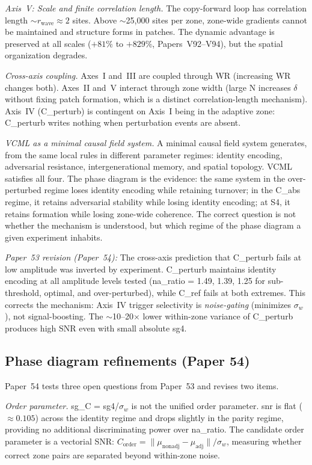 \documentclass[11pt]{article}
\begin{document}
\textit{Axis~V: Scale and finite correlation length.}
The copy-forward loop has correlation length $\sim r_\text{wave} \approx 2$
sites.
Above $\sim$25,000 sites per zone, zone-wide gradients cannot be maintained
and structure forms in patches.
The dynamic advantage is preserved at all scales
($+81\%$ to $+829\%$, Papers~V92--V94), but the spatial organization
degrades.

\textit{Cross-axis coupling.}
Axes~I and~III are coupled through WR (increasing WR changes both).
Axes~II and~V interact through zone width (large N increases $\delta$ without
fixing patch formation, which is a distinct correlation-length mechanism).
Axis~IV (C\_perturb) is contingent on Axis~I being in the adaptive zone:
C\_perturb writes nothing when perturbation events are absent.

\textit{VCML as a minimal causal field system.}
A minimal causal field system generates, from the same local rules in different
parameter regimes: identity encoding, adversarial resistance, intergenerational
memory, and spatial topology.
VCML satisfies all four.
The phase diagram is the evidence: the same system in the over-perturbed regime
loses identity encoding while retaining turnover; in the C\_abs regime, it
retains adversarial stability while losing identity encoding; at S4, it retains
formation while losing zone-wide coherence.
The correct question is not whether the mechanism is understood, but which
regime of the phase diagram a given experiment inhabits.

\textit{Paper~53 revision (Paper~54):}
The cross-axis prediction that C\_perturb fails at low amplitude was inverted
by experiment.
C\_perturb maintains identity encoding at all amplitude levels tested
(na\_ratio = 1.49, 1.39, 1.25 for sub-threshold, optimal, and over-perturbed),
while C\_ref fails at both extremes.
This corrects the mechanism: Axis~IV trigger selectivity is \emph{noise-gating}
(minimizes $\sigma_w$), not signal-boosting.
The $\sim$10--20$\times$ lower within-zone variance of C\_perturb produces
high SNR even with small absolute sg4.

\subsection{Phase diagram refinements (Paper 54)}
\label{subsec:paper54}

Paper~54 tests three open questions from Paper~53 and revises two items.

\textit{Order parameter.}
sg\_C = sg4/$\sigma_w$ is not the unified order parameter.
snr is flat ($\approx 0.105$) across the identity regime and drops slightly in
the parity regime, providing no additional discriminating power over na\_ratio.
The candidate order parameter is a vectorial SNR:
$C_\text{order} = \|\mu_\text{nonadj} - \mu_\text{adj}\| / \sigma_w$,
measuring whether correct zone pairs are separated beyond within-zone noise.
\end{document}
